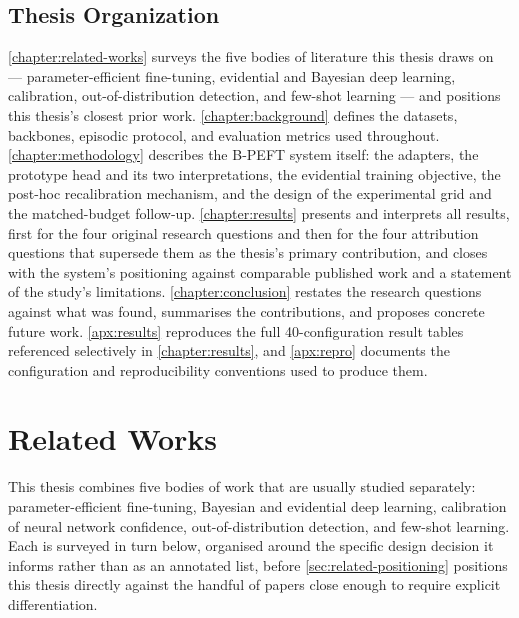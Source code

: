 \documentclass{iutbscthesis}
\begin{document}
\section{Thesis Organization}

\autoref{chapter:related-works} surveys the five bodies of literature this thesis draws on — parameter-efficient fine-tuning, evidential and Bayesian deep learning, calibration, out-of-distribution detection, and few-shot learning — and positions this thesis's closest prior work. \autoref{chapter:background} defines the datasets, backbones, episodic protocol, and evaluation metrics used throughout. \autoref{chapter:methodology} describes the B-PEFT system itself: the adapters, the prototype head and its two interpretations, the evidential training objective, the post-hoc recalibration mechanism, and the design of the experimental grid and the matched-budget follow-up. \autoref{chapter:results} presents and interprets all results, first for the four original research questions and then for the four attribution questions that supersede them as the thesis's primary contribution, and closes with the system's positioning against comparable published work and a statement of the study's limitations. \autoref{chapter:conclusion} restates the research questions against what was found, summarises the contributions, and proposes concrete future work. \autoref{apx:results} reproduces the full 40-configuration result tables referenced selectively in \autoref{chapter:results}, and \autoref{apx:repro} documents the configuration and reproducibility conventions used to produce them.


\chapter{Related Works}
\label{chapter:related-works}

This thesis combines five bodies of work that are usually studied separately: parameter-efficient fine-tuning, Bayesian and evidential deep learning, calibration of neural network confidence, out-of-distribution detection, and few-shot learning. Each is surveyed in turn below, organised around the specific design decision it informs rather than as an annotated list, before \autoref{sec:related-positioning} positions this thesis directly against the handful of papers close enough to require explicit differentiation.
\end{document}
